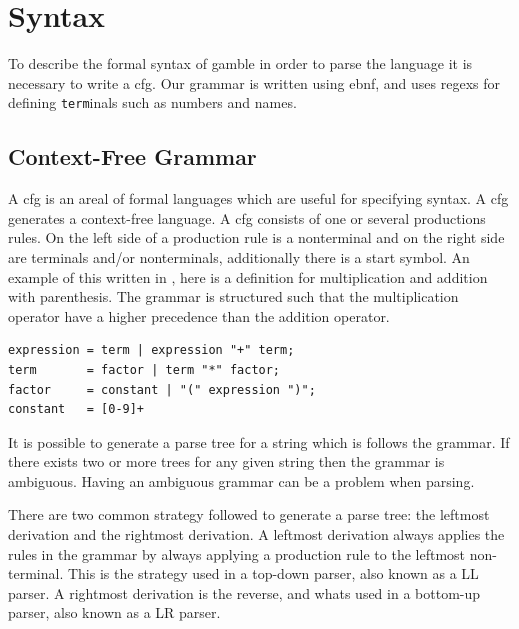 \chapter{Syntax}\label{chap:syntax}

To describe the formal syntax of \gls{gamble} in order to parse the language it is necessary to write a \acrfull{cfg}.
Our grammar is written using \acrfull{ebnf}, and uses \acrfull{regex}s for defining \texttt{term}inals such as numbers and names.

\section{Context-Free Grammar}
A \acrshort{cfg} is an areal of formal languages which are useful for specifying syntax. 
A \acrshort{cfg} generates a context-free language. 
A \acrshort{cfg} consists of one or several productions rules.
On the left side of a production rule is a nonterminal and on the right side are terminals and/or nonterminals, additionally there is a start symbol. %
An example of this written in , here is a definition for multiplication and addition with parenthesis.
The grammar is structured such that the multiplication operator have a higher precedence than the addition operator.

\begin{lstlisting}[caption={An example of a \acrshort{cfg} written in \acrshort{ebnf}, with \acrshort{regex} for defining numbers. },frame=tlrb,label={lst:cfglst1},numbers=none]
expression = term | expression "+" term;
term       = factor | term "*" factor;
factor     = constant | "(" expression ")";
constant   = [0-9]+
\end{lstlisting}

It is possible to generate a parse tree for a string which is follows the grammar. 
If there exists two or more trees for any given string then the grammar is ambiguous. 
Having an ambiguous grammar can be a problem when parsing.

There are two common strategy followed to generate a parse tree: the leftmost derivation and the rightmost derivation. 
A leftmost derivation always applies the rules in the grammar by always applying a production rule to the leftmost non-terminal. 
This is the strategy used in a top-down parser, also known as a LL parser.
A rightmost derivation is the reverse, and whats used in a bottom-up parser, also known as a LR parser. 

